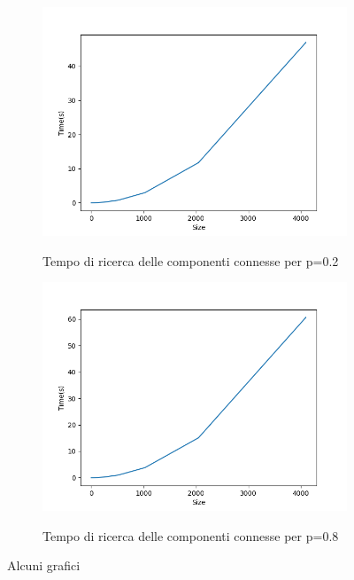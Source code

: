 \documentclass[]{article}
\begin{document}
\begin{figure}[H]
    \centering
    \begin{subfigure}[b]{0.45\linewidth} 
        \centering
        \captionsetup{justification=centering}
        \caption{Tempo di ricerca delle componenti connesse per p=0.2}
        \includegraphics[width=\textwidth]{cc_time_p=02}
        \label{fig:ccs_time_p=02}
    \end{subfigure}
    \quad
    \begin{subfigure}[b]{0.45\linewidth}
        \centering
                \captionsetup{justification=centering}

        \caption{Tempo di ricerca delle componenti connesse per p=0.8}
        \includegraphics[width=\textwidth]{cc_time_p=08}
        \label{fig:ccs_time_p=08}
    \end{subfigure}
    \caption{Alcuni grafici}
    \label{fig:nccs}
\end{figure}
\newpage
\end{document}
